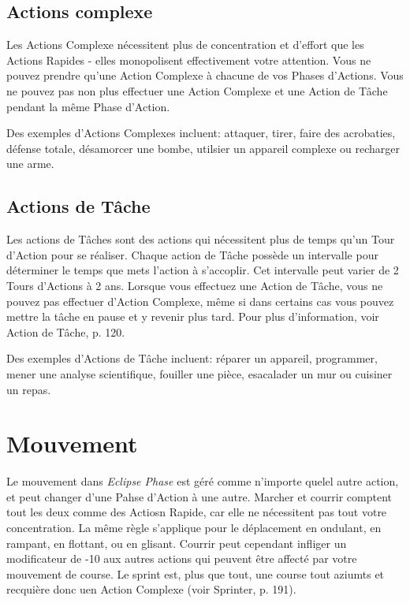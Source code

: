 \subsection{Actions complexe} \label{sec:combat-complex-actions} 

Les Actions Complexe nécessitent plus de concentration et d'effort que les Actions Rapides - elles monopolisent effectivement votre attention. Vous ne pouvez prendre qu'une Action Complexe à chacune de vos Phases d'Actions. Vous ne pouvez pas non plus effectuer une Action Complexe et une Action de Tâche pendant la même Phase d'Action. 

Des exemples d'Actions Complexes incluent: attaquer, tirer, faire des acrobaties, défense totale, désamorcer une bombe, utilsier un appareil complexe ou recharger une arme. 

\subsection{Actions de Tâche} \label{sec:combat-task-actions} 

Les actions de Tâches sont des actions qui nécessitent plus de temps qu'un Tour d'Action pour se réaliser. Chaque action de Tâche possède un intervalle pour déterminer le temps que mets l'action à s'accoplir. Cet intervalle peut varier de 2 Tours d'Actions à 2 ans. Lorsque vous effectuez une Action de Tâche, vous ne pouvez pas effectuer d'Action Complexe, même si dans certains cas vous pouvez mettre la tâche en pause et y revenir plus tard. Pour plus d'information, voir Action de Tâche, p. 120. 

Des exemples d'Actions de Tâche incluent: réparer un appareil, programmer, mener une analyse scientifique, fouiller une pièce, esacalader un mur ou cuisiner un repas. 

\section{Mouvement} \label{sec:combat-movement} 

Le mouvement dans \emph{Eclipse Phase} est géré comme n'importe quelel autre action, et peut changer d'une Pahse d'Action à une autre. Marcher et courrir comptent tout les deux comme des Actiosn Rapide, car elle ne nécessitent pas tout votre concentration. La même règle s'applique pour le déplacement en ondulant, en rampant, en flottant, ou en glisant. Courrir peut cependant infliger un modificateur de -10 aux autres actions qui peuvent être affecté par votre mouvement de course. Le sprint est, plus que tout, une course tout aziumts et recquière donc uen Action Complexe (voir Sprinter, p. 191). 

